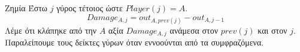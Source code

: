 {}
\begin{definitiongr}{Ζημία}
  Έστω $j$ γύρος τέτοιος ώστε $Player\left(j\right) = A$.
  \begin{equation}
    Damage_{A, j} = out_{A, prev\left(j\right)} - out_{A, j-1}
  \end{equation}
  Λέμε ότι κλάπηκε από την $A$ αξία $Damage_{A, j}$ ανάμεσα στον $prev\left(j\right)$ και στον $j$. Παραλείπουμε τους δείκτες
  γύρων όταν εννοούνται από τα συμφραζόμενα.
\end{definitiongr}
